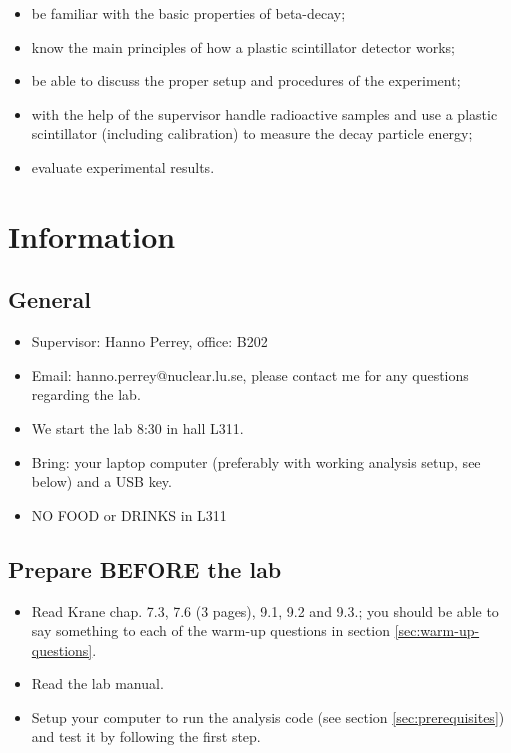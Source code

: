 \documentclass[a4,11pt, notitlepage]{article}
\begin{document}
\begin{itemize}
\item be familiar with the basic properties of beta-decay;
\item know the main principles of how a plastic scintillator detector works;
\item be able to discuss the proper setup and procedures of the experiment;
\item with the help of the supervisor handle radioactive samples and use a
  plastic scintillator (including calibration) to measure the decay particle energy;
\item evaluate experimental results.
\end{itemize}

\section{Information}


\subsection{General}

\begin{itemize}
\item Supervisor: Hanno Perrey, office: B202
\item Email: hanno.perrey@nuclear.lu.se, please contact me for any questions regarding the lab. 
\item We start the lab 8:30 in hall L311. 
\item Bring: your laptop computer (preferably with working
  analysis setup, see below) and a USB key. 
\item NO FOOD or DRINKS in L311
\end{itemize}



\subsection{Prepare BEFORE the lab}

\begin{itemize}
\item Read Krane chap. 7.3, 7.6 (3 pages), 9.1, 9.2 and 9.3.; you
  should be able to say something to each of the warm-up questions in
  section \ref{sec:warm-up-questions}.
\item Read the lab manual.
\item Setup your computer to run the analysis code (see section \ref{sec:prerequisites})
  and test it by following the first step.
\end{itemize}
\end{document}
